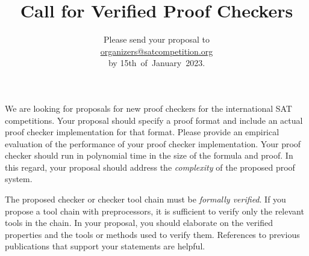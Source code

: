 \documentclass{article}
\title{Call for Verified Proof Checkers}
\author{Please send your proposal to\\[.3em] \mbox{\url{organizers@satcompetition.org}}\\[.3em] by 15th~of~January~2023.}
\date{}
\begin{document}
\maketitle
\thispagestyle{empty}

We are looking for proposals for new proof checkers for the international SAT competitions. 
Your proposal should specify a proof format and include an actual proof checker implementation for that format.
Please provide an empirical evaluation of the performance of your proof checker implementation.
Your proof checker should run in polynomial time in the size of the formula and proof. 
In this regard, your proposal should address the \emph{complexity} of the proposed proof system. 

The proposed checker or checker tool chain must be \emph{formally verified}. 
If you propose a tool chain with preprocessors, it is sufficient to verify only the relevant tools in the chain. 
In your proposal, you should elaborate on the verified properties and the tools or methods used to verify them.
References to previous publications that support your statements are helpful.





%
\end{document}
